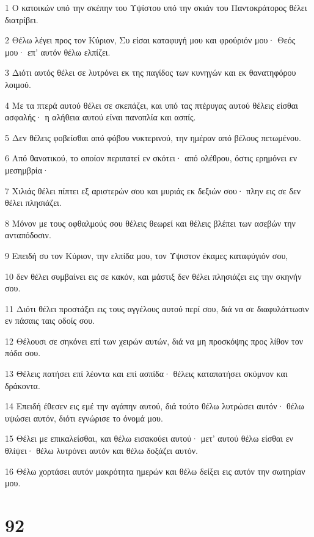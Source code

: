 \par 1 Ο κατοικών υπό την σκέπην του Υψίστου υπό την σκιάν του Παντοκράτορος θέλει διατρίβει.
\par 2 Θέλω λέγει προς τον Κύριον, Συ είσαι καταφυγή μου και φρούριόν μου· Θεός μου· επ' αυτόν θέλω ελπίζει.
\par 3 Διότι αυτός θέλει σε λυτρόνει εκ της παγίδος των κυνηγών και εκ θανατηφόρου λοιμού.
\par 4 Με τα πτερά αυτού θέλει σε σκεπάζει, και υπό τας πτέρυγας αυτού θέλεις είσθαι ασφαλής· η αλήθεια αυτού είναι πανοπλία και ασπίς.
\par 5 Δεν θέλεις φοβείσθαι από φόβου νυκτερινού, την ημέραν από βέλους πετωμένου.
\par 6 Από θανατικού, το οποίον περιπατεί εν σκότει· από ολέθρου, όστις ερημόνει εν μεσημβρία·
\par 7 Χιλιάς θέλει πίπτει εξ αριστερών σου και μυριάς εκ δεξιών σου· πλην εις σε δεν θέλει πλησιάζει.
\par 8 Μόνον με τους οφθαλμούς σου θέλεις θεωρεί και θέλεις βλέπει των ασεβών την ανταπόδοσιν.
\par 9 Επειδή συ τον Κύριον, την ελπίδα μου, τον Ύψιστον έκαμες καταφύγιόν σου,
\par 10 δεν θέλει συμβαίνει εις σε κακόν, και μάστιξ δεν θέλει πλησιάζει εις την σκηνήν σου.
\par 11 Διότι θέλει προστάξει εις τους αγγέλους αυτού περί σου, διά να σε διαφυλάττωσιν εν πάσαις ταις οδοίς σου.
\par 12 Θέλουσι σε σηκόνει επί των χειρών αυτών, διά να μη προσκόψης προς λίθον τον πόδα σου.
\par 13 Θέλεις πατήσει επί λέοντα και επί ασπίδα· θέλεις καταπατήσει σκύμνον και δράκοντα.
\par 14 Επειδή έθεσεν εις εμέ την αγάπην αυτού, διά τούτο θέλω λυτρώσει αυτόν· θέλω υψώσει αυτόν, διότι εγνώρισε το όνομά μου.
\par 15 Θέλει με επικαλείσθαι, και θέλω εισακούει αυτού· μετ' αυτού θέλω είσθαι εν θλίψει· θέλω λυτρόνει αυτόν και θέλω δοξάζει αυτόν.
\par 16 Θέλω χορτάσει αυτόν μακρότητα ημερών και θέλω δείξει εις αυτόν την σωτηρίαν μου.

\chapter{92}

